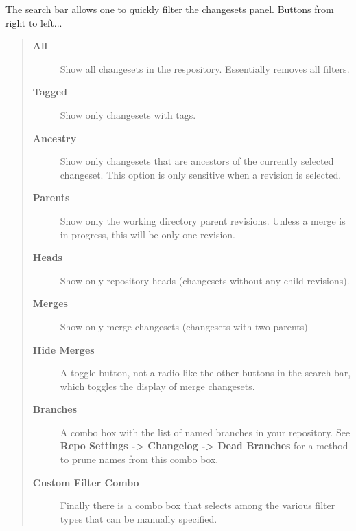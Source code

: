 \documentclass[letterpaper,10pt,english]{manual}
\begin{document}
The search bar allows one to quickly filter the changesets panel.
Buttons from right to left...
\begin{quote}
\begin{description}
\item[\textbf{All}]
Show all changesets in the respository.  Essentially removes all
filters.

\item[\textbf{Tagged}]
Show only changesets with tags.

\item[\textbf{Ancestry}]
Show only changesets that are ancestors of the currently
selected changeset.  This option is only sensitive when a
revision is selected.

\item[\textbf{Parents}]
Show only the working directory parent revisions.  Unless a
merge is in progress, this will be only one revision.

\item[\textbf{Heads}]
Show only repository heads (changesets without any child
revisions).

\item[\textbf{Merges}]
Show only merge changesets (changesets with two parents)

\item[\textbf{Hide Merges}]
A toggle button, not a radio like the other buttons in the
search bar, which toggles the display of merge changesets.

\item[\textbf{Branches}]
A combo box with the list of named branches in your repository.
See \textbf{Repo Settings -\textgreater{} Changelog -\textgreater{} Dead Branches} for
a method to prune names from this combo box.

\item[\textbf{Custom Filter Combo}]
Finally there is a combo box that selects among the various
filter types that can be manually specified.

\end{description}
\end{quote}
\end{document}
